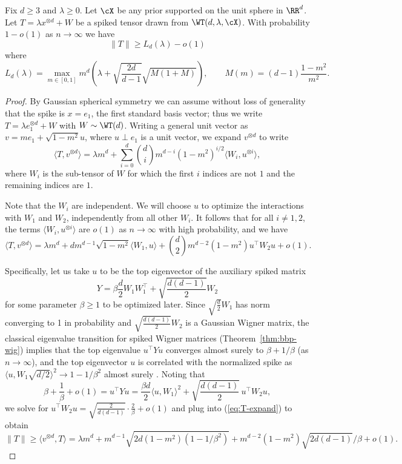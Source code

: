 \documentclass{article}
\begin{document}
\begin{theorem}
\label{thm:sph-upper}
Fix $d \ge 3$ and $\lambda \ge 0$. Let $\cX$ be any prior supported on the unit sphere in $\RR^d$. Let $T = \lambda x^{\otimes d} + W$ be a spiked tensor drawn from $\WT(d,\lambda,\cX)$. With probability $1-o(1)$ as $n\to\infty$ we have
$$\|T\| \ge L_d(\lambda) - o(1)$$
where
\begin{equation} L_d(\lambda) = \max_{m \in [0,1]} m^d \left(\lambda + \sqrt{\frac{2d}{d-1}} \sqrt{M (1+M)}\right), \qquad M(m) = (d-1) \frac{1-m^2}{m^2}. \label{eq:upper-opt}\end{equation}
\end{theorem}

\begin{proof}
By Gaussian spherical symmetry we can assume without loss of generality that the spike is $x = e_1$, the first standard basis vector; thus we write $T = \lambda e_1^{\otimes d} + W$ with $W \sim \WT(d)$. Writing a general unit vector as $v = m e_1 + \sqrt{1-m^2} u$, where $u \perp e_1$ is a unit vector, we expand $v^{\otimes d}$ to write
$$ \langle T, v^{\otimes d} \rangle = \lambda m^d + \sum_{i=0}^d \binom{d}{i} m^{d-i} (1-m^2)^{i/2} \langle W_i, u^{\otimes i} \rangle, $$
where $W_i$ is the sub-tensor of $W$ for which the first $i$ indices are not $1$ and the remaining indices are $1$.

Note that the $W_i$ are independent. We will choose $u$ to optimize the interactions with $W_1$ and $W_2$, independently from all other $W_i$. It follows that for all $i \ne 1,2$, the terms $\langle W_i, u^{\otimes i} \rangle$ are $o(1)$ as $n\to\infty$ with high probability, and we have
\begin{equation} \langle T, v^{\otimes d} \rangle = \lambda m^d + d m^{d-1} \sqrt{1-m^2} \langle W_1, u \rangle + \binom{d}{2} m^{d-2} (1-m^2) u^\top W_2 u + o(1). \label{eq:T-expand}\end{equation}

Specifically, let us take $u$ to be the top eigenvector of the auxiliary spiked matrix
$$ Y = \beta \frac{d}{2} W_1 W_1^\top + \sqrt{\frac{d(d-1)}{2}} W_2 $$
for some parameter $\beta \geq 1$ to be optimized later. Since $\sqrt{\frac{d}{2}} W_1$ has norm converging to 1 in probability and $\sqrt{\frac{d(d-1)}{2}} W_2$ is a Gaussian Wigner matrix, the classical eigenvalue transition for spiked Wigner matrices (Theorem~\ref{thm:bbp-wig}) implies that the top eigenvalue $u^\top Y u$ converges almost surely to $\beta + 1/\beta$ (as $n \to \infty$), and the top eigenvector $u$ is correlated with the normalized spike as $\langle u, W_1 \sqrt{d/2} \rangle^2 \to 1 - 1/\beta^2$ almost surely \cite{peche,fp,cdf,eig-vec}. Noting that
$$\beta + \frac1\beta + o(1) = u^\top Y u = \frac{\beta d}{2} \langle u,W_1 \rangle^2 + \sqrt{\frac{d(d-1)}{2}} \,u^\top W_2 u, $$
we solve for $u^\top W_2 u = \sqrt{\frac{2}{d(d-1)}}\cdot\frac{2}{\beta} + o(1)$ and plug into (\ref{eq:T-expand}) to obtain
$$ \|T\| \ge \langle v^{\otimes d}, T \rangle = \lambda m^d + m^{d-1} \sqrt{2d(1-m^2)(1-1/\beta^2)} + m^{d-2} (1-m^2) \sqrt{2d(d-1)} /\beta + o(1). $$


\end{proof}
\end{document}
